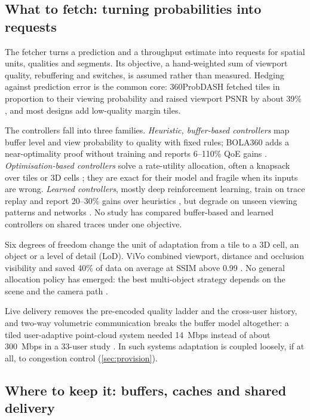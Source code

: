\subsection{What to fetch: turning probabilities into requests}

The fetcher turns a prediction and a throughput estimate into requests for spatial units, qualities and segments. Its objective, a hand-weighted sum of viewport quality, rebuffering and switches, is assumed rather than measured. Hedging against prediction error is the common core: 360ProbDASH fetched tiles in proportion to their viewing probability and raised viewport PSNR by about 39\% \cite{W2766324256}, and most designs add low-quality margin tiles.

The controllers fall into three families. \emph{Heuristic, buffer-based controllers} map buffer level and view probability to quality with fixed rules; BOLA360 adds a near-optimality proof without training and reports 6--110\% QoE gains \cite{W4394890851}. \emph{Optimisation-based controllers} solve a rate-utility allocation, often a knapsack over tiles or 3D cells \cite{W2963389850}; they are exact for their model and fragile when its inputs are wrong. \emph{Learned controllers}, mostly deep reinforcement learning, train on trace replay and report 20--30\% gains over heuristics \cite{W2920378308}, but degrade on unseen viewing patterns and networks \cite{W4403826584}. No study has compared buffer-based and learned controllers on shared traces under one objective.

Six degrees of freedom change the unit of adaptation from a tile to a 3D cell, an object or a level of detail (LoD). ViVo combined viewport, distance and occlusion visibility and saved 40\% of data on average at SSIM above 0.99 \cite{W3021314748}. No general allocation policy has emerged: the best multi-object strategy depends on the scene and the camera path \cite{W2982262421}.

Live delivery removes the pre-encoded quality ladder and the cross-user history, and two-way volumetric communication breaks the buffer model altogether: a tiled user-adaptive point-cloud system needed 14~Mbps instead of about 300~Mbps in a 33-user study \cite{W4304091566}. In such systems adaptation is coupled loosely, if at all, to congestion control (\cref{sec:provision}).

\subsection{Where to keep it: buffers, caches and shared delivery}


